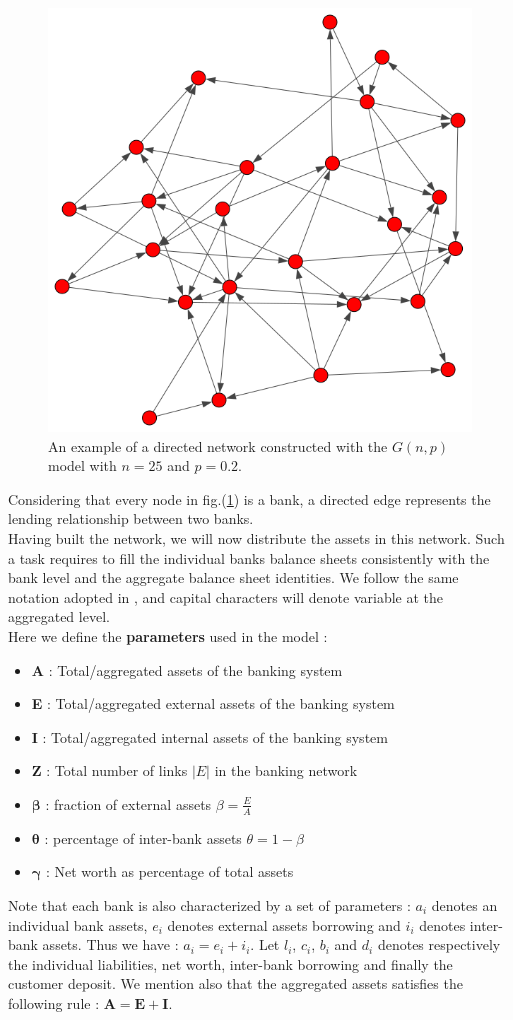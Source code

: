 \documentclass[14pt]{article}
\providecommand{\reff}[1]{(\ref{#1})}
\begin{document}
\begin{figure}[h]
    \centering
  \includegraphics[width=0.5\linewidth]{img/fig2.png}
  \caption{An example of a directed network constructed with the $G(n,p)$ model with $n=25$ and $p=0.2$.}
  \label{fig:2}
\end{figure}
Considering that every node in fig.\reff{fig:2} is a bank, a directed edge represents the lending relationship between two banks.
\\Having built the network, we will now distribute the assets in this network. Such a task requires to fill the individual banks balance sheets consistently with the bank level and the aggregate balance sheet identities. We follow the same notation adopted in \cite{art1}, and capital characters will denote variable at the aggregated level.
\vspace{25mm}
\\Here we define the \textbf{parameters} used in the model :
\begin{itemize}
\item \textbf{A} : Total/aggregated assets of the banking system
\item \textbf{E} : Total/aggregated external assets of the banking
system  
\item \textbf{I} : Total/aggregated internal assets of the banking
system  
\item \textbf{Z} : Total number of links $|E|$ in the banking network
\item $\boldsymbol{\beta}$ : fraction of external assets $\beta = \frac{E}{A}$
\item $\boldsymbol{\theta}$ : percentage of inter-bank assets $\theta = 1-\beta$
\item $\boldsymbol{\gamma}$ : Net worth as percentage of total assets 
\end{itemize}
Note that each bank is also characterized by a set of parameters : $a_i$ denotes an individual bank assets, $e_i$ denotes external assets borrowing  and $i_i$ denotes inter-bank assets. Thus we have : $a_i = e_i + i_i$. Let $l_i$, $c_i$, $b_i$ and $d_i$ denotes respectively the individual liabilities, net worth, inter-bank borrowing and finally the customer deposit. We mention also that the aggregated assets satisfies the following rule : $\boldsymbol{A}=\boldsymbol{E} + \boldsymbol{I}$.
\end{document}
